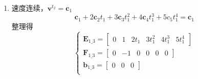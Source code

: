 \documentclass[40pt,a4paper,UTF8,twocolumn]{ctexart}%
\numberwithin{equation}{section}
\begin{document}
\begin{enumerate}
\begin{equation}
\begin{array}{l}
\begin{bmatrix}
                        -1&0&0&0&0&0
                    \end{bmatrix}\\
                    b_{1\_2} = 
                    \begin{bmatrix}
                       0 & 0 & 0
                    \end{bmatrix}\\
                \end{array}
            \right.
            \label{eq1.6} %
        \end{equation}
    接下来具体解释式(\ref{eq1.1})的具体形式，针对每个中间状态约束而言，式(\ref{eq1.1})的形式为
    \begin{equation}
        \begin{pmatrix}
            \bm E_i & \bm F_i
        \end{pmatrix}
        \begin{pmatrix}
            \bm c_i \\ \bm c_{i+1}
        \end{pmatrix}
        =
        \begin{pmatrix}
            \bm D_i \\ \bm 0_{\bar{d_i}\times m}
        \end{pmatrix}
    \end{equation}
    其中$\bm E_i$在这个上下文中表示$\bm C_1$段的约束，$\bm F_i$表示$\bm C_2$段的约束，
    $\bm c_i, \bm c_{i+1}$分别表示$\bm C_1,\bm C_2$段piece的optimal flat output的系数。
    
    按照该思路依次推导剩余的velocity,acceleration,jerk,snap连续时的中间状态约束。
    \item 速度连续，$\bm v^{t_2}=\bm c_1$
    \begin{equation}
        \bm c_1+2\bm c_2t_1+3\bm c_3t_1^2+4\bm c_4t_1^3+5c_5t_1^4=\bm c_1
    \end{equation}
    整理得
    \begin{equation}
        \left\{
            \begin{array}{l}
                \bm E_{1\_3}=
                \begin{bmatrix}
                    0&1&2t_1&3t_1^2&4t_1^3&5t_1^4
                \end{bmatrix}\\
                \bm F_{1\_3}=
                \begin{bmatrix}
                    0&-1&0&0&0&0
                \end{bmatrix}\\
                \bm b_{1\_3} = 
                \begin{bmatrix}
                    0 & 0 & 0
                \end{bmatrix}\\
            \end{array}
        \right.
        \label{eq1.6} %
    \end{equation}


\end{enumerate}
\end{document}
